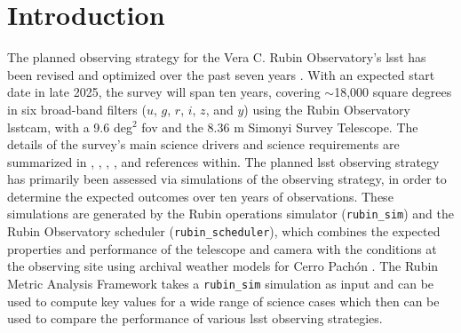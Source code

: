 \documentclass[preprintm,linenumbers]{aastex631}
\newcommand{\rubinsim}{\texttt{rubin\_sim}\xspace}
\newcommand{\rubinscheduler}{\texttt{rubin\_scheduler}\xspace}
\newcommand{\maf}{\texttt{MAF}\xspace}
\begin{document}
	\section{Introduction}
	\label{sec:introduction}

\glsresetall

	The planned observing strategy for the Vera C. Rubin Observatory's \gls*{lsst} has been revised and optimized over the past seven years \citep{SCOC_Report_1,2022ApJS..258....1B, SCOC_Report_2,SCOC_Report_3}. 
 With an expected start date in late 2025, the survey will span ten years, covering $\sim$18,000 square degrees in six broad-band filters ($u$, $g$, $r$, $i$, $z$, and $y$) using the Rubin Observatory \gls*{lsstcam}, with a 9.6 deg$^2$ \gls*{fov} and the 8.36 m Simonyi Survey Telescope. The details of the survey's main science drivers and science requirements are summarized in \cite{lsstScienceBook2009}, \cite{lsstSRD}, \cite{2019ApJ...873..111I}, \cite{2022ApJS..258....1B}, and references within. 
 The planned \gls*{lsst} observing strategy has primarily been assessed via simulations of the observing strategy, in order to determine the expected outcomes over ten years of observations.
 These simulations are generated by the Rubin operations simulator (\rubinsim) and the Rubin Observatory scheduler (\rubinscheduler), which combines the expected properties and performance of the telescope and camera with the conditions at the observing site using archival weather models for Cerro Pach\'on \citep{2014SPIE.9150E..14C, 2014SPIE.9150E..15D, 2017arXiv170804058L, 2019AJ....157..151N, jones_r_lynne_2020_4048838}.
 The Rubin Metric Analysis Framework \citep[\maf; ][]{2014SPIE.9149E..0BJ} takes a \rubinsim simulation as input and can be used to compute key values for a wide range of science cases which then can be used to compare the performance of various \gls*{lsst} observing strategies.
	
\end{document}
